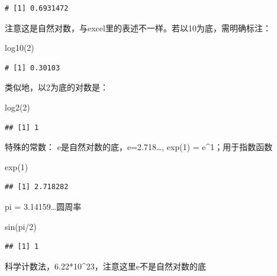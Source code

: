 \documentclass[
]{book}
\newenvironment{Shaded}{\begin{snugshade}}{\end{snugshade}}
\newcommand{\DecValTok}[1]{\textcolor[rgb]{0.00,0.00,0.81}{#1}}
\newcommand{\FunctionTok}[1]{\textcolor[rgb]{0.00,0.00,0.00}{#1}}
\newcommand{\NormalTok}[1]{#1}
\newcommand{\SpecialCharTok}[1]{\textcolor[rgb]{0.00,0.00,0.00}{#1}}
\begin{document}
\begin{verbatim}
# [1] 0.6931472
\end{verbatim}

注意这是自然对数，与excel里的表述不一样。若以10为底，需明确标注：

\begin{Shaded}
\begin{Highlighting}[]
\FunctionTok{log10}\NormalTok{(}\DecValTok{2}\NormalTok{) }
\end{Highlighting}
\end{Shaded}

\begin{verbatim}
# [1] 0.30103
\end{verbatim}

类似地，以2为底的对数是：

\begin{Shaded}
\begin{Highlighting}[]
\FunctionTok{log2}\NormalTok{(}\DecValTok{2}\NormalTok{)}
\end{Highlighting}
\end{Shaded}

\begin{verbatim}
## [1] 1
\end{verbatim}

特殊的常数：
e是自然对数的底，e=2.718\ldots, exp(1) = e\^{}1；用于指数函数

\begin{Shaded}
\begin{Highlighting}[]
\FunctionTok{exp}\NormalTok{(}\DecValTok{1}\NormalTok{)}
\end{Highlighting}
\end{Shaded}

\begin{verbatim}
## [1] 2.718282
\end{verbatim}

pi = 3.14159\ldots 圆周率

\begin{Shaded}
\begin{Highlighting}[]
\FunctionTok{sin}\NormalTok{(pi}\SpecialCharTok{/}\DecValTok{2}\NormalTok{)}
\end{Highlighting}
\end{Shaded}

\begin{verbatim}
## [1] 1
\end{verbatim}

科学计数法，6.22*10\^{}23，注意这里e不是自然对数的底
\end{document}
